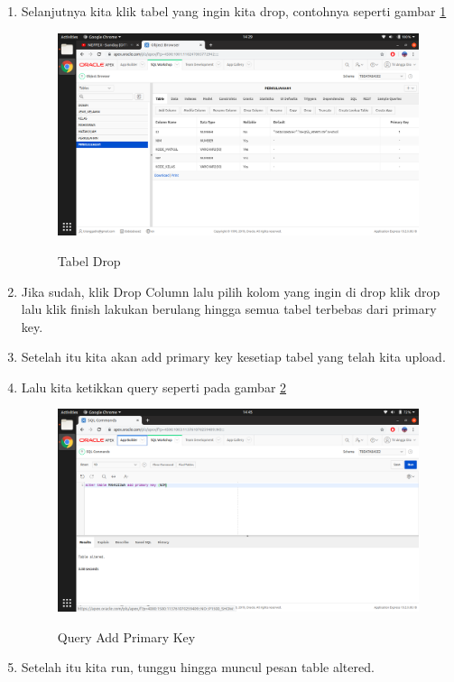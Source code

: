 \begin{enumerate}
\item Selanjutnya kita klik tabel yang ingin kita drop, contohnya seperti gambar \ref{10}
\begin{figure}[H]
\centering
\caption{Tabel Drop}
\includegraphics[width=1\textwidth]{figures/10}
\label{10}
\end{figure}

\item Jika sudah, klik Drop Column lalu pilih kolom yang ingin di drop klik drop lalu klik finish lakukan berulang hingga semua tabel terbebas dari primary key.

\item Setelah itu kita akan add primary key kesetiap tabel yang telah kita upload.

\item Lalu kita ketikkan query seperti pada gambar \ref{23}
\begin{figure}[H]
\centering
\caption{Query Add Primary Key}
\includegraphics[width=1\textwidth]{figures/23}
\label{23}
\end{figure}

\item Setelah itu kita run, tunggu hingga muncul pesan table altered.


\end{enumerate}
